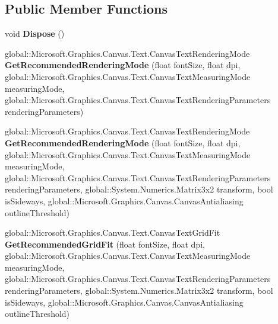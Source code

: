 \subsection*{Public Member Functions}
\begin{DoxyCompactItemize}
\item 
\mbox{\label{class_microsoft_1_1_graphics_1_1_canvas_1_1_text_1_1_canvas_font_face_a929e502ef0c2b824b2a59f1dabbe2fc8}} 
void {\bfseries Dispose} ()
\item 
\mbox{\label{class_microsoft_1_1_graphics_1_1_canvas_1_1_text_1_1_canvas_font_face_a20dec27603e0f42c6754d98b9b3494dc}} 
global\+::\+Microsoft.\+Graphics.\+Canvas.\+Text.\+Canvas\+Text\+Rendering\+Mode {\bfseries Get\+Recommended\+Rendering\+Mode} (float font\+Size, float dpi, global\+::\+Microsoft.\+Graphics.\+Canvas.\+Text.\+Canvas\+Text\+Measuring\+Mode measuring\+Mode, global\+::\+Microsoft.\+Graphics.\+Canvas.\+Text.\+Canvas\+Text\+Rendering\+Parameters rendering\+Parameters)
\item 
\mbox{\label{class_microsoft_1_1_graphics_1_1_canvas_1_1_text_1_1_canvas_font_face_a7ba21595666b01311efff611f0ddc72c}} 
global\+::\+Microsoft.\+Graphics.\+Canvas.\+Text.\+Canvas\+Text\+Rendering\+Mode {\bfseries Get\+Recommended\+Rendering\+Mode} (float font\+Size, float dpi, global\+::\+Microsoft.\+Graphics.\+Canvas.\+Text.\+Canvas\+Text\+Measuring\+Mode measuring\+Mode, global\+::\+Microsoft.\+Graphics.\+Canvas.\+Text.\+Canvas\+Text\+Rendering\+Parameters rendering\+Parameters, global\+::\+System.\+Numerics.\+Matrix3x2 transform, bool is\+Sideways, global\+::\+Microsoft.\+Graphics.\+Canvas.\+Canvas\+Antialiasing outline\+Threshold)
\item 
\mbox{\label{class_microsoft_1_1_graphics_1_1_canvas_1_1_text_1_1_canvas_font_face_a2ce24a3338c9801d118760da55d735a1}} 
global\+::\+Microsoft.\+Graphics.\+Canvas.\+Text.\+Canvas\+Text\+Grid\+Fit {\bfseries Get\+Recommended\+Grid\+Fit} (float font\+Size, float dpi, global\+::\+Microsoft.\+Graphics.\+Canvas.\+Text.\+Canvas\+Text\+Measuring\+Mode measuring\+Mode, global\+::\+Microsoft.\+Graphics.\+Canvas.\+Text.\+Canvas\+Text\+Rendering\+Parameters rendering\+Parameters, global\+::\+System.\+Numerics.\+Matrix3x2 transform, bool is\+Sideways, global\+::\+Microsoft.\+Graphics.\+Canvas.\+Canvas\+Antialiasing outline\+Threshold)

\end{DoxyCompactItemize}
